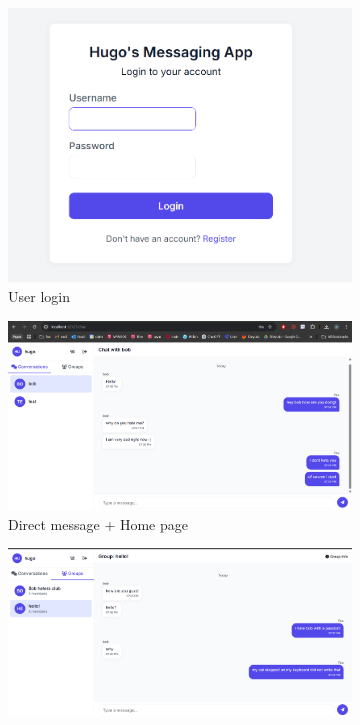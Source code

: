 \documentclass[12pt]{Article}
\begin{document}
\begin{figure}[H]
    \centering
    \begin{subfigure}{0.45\textwidth}
        \centering
        \includegraphics[width=\textwidth]{images/1.png}
        \caption{User login}
    \end{subfigure}
    \begin{subfigure}{0.45\textwidth}
        \centering
        \includegraphics[width=\textwidth]{images/2.png}
        \caption{Direct message + Home page}
    \end{subfigure}
    \begin{subfigure}{0.45\textwidth}
        \centering
        \includegraphics[width=\textwidth]{images/3.png}

\end{subfigure}
\end{figure}
\end{document}
